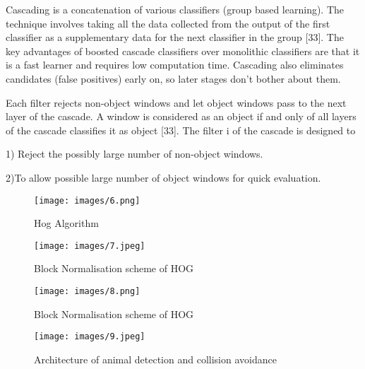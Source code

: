 \documentclass[14pt,a4paper,final]{extreport}
\begin{document}
Cascading is a concatenation of various classifiers (group based learning). The technique involves taking all the data collected from the output of the first classifier as a supplementary data for the next classifier in the group [33]. The key advantages of boosted cascade classifiers over monolithic classifiers are that it is a fast learner and requires low computation time. Cascading also eliminates candidates (false positives) early on, so later stages don’t bother about them.

\item Each filter rejects non-object windows and let object windows pass to the next layer of the cascade. A window is considered as an object if and only of all layers of the cascade classifies it as object [33]. The filter i of the cascade is designed to

\item 1) Reject the possibly large number of non-object windows.

\item 2)To allow possible large number of object windows for quick evaluation.
\newline
\newline

\begin{figure}[h]
	\begin{center}
		\texttt{[image: images/6.png]}
		\vspace{.1 cm}
		\caption[Hog Algorithm]{Hog Algorithm}
	\end{center}
\end{figure}
\begin{figure}[h]
	\begin{center}
		\texttt{[image: images/7.jpeg]}
		\vspace{.1 cm}
		\caption [Block Normalisation scheme of HOG]{Block Normalisation scheme of HOG}
	\end{center}
\end{figure}
\begin{figure}[h]
	\begin{center}
		\texttt{[image: images/8.png]}
		\vspace{.5cm}
		\caption [Block Normalisation scheme of HOG]{Block Normalisation scheme of HOG}
	\end{center}
\end{figure}
\begin{figure}[h]
	\begin{center}
		\texttt{[image: images/9.jpeg]}
		\caption [Architecture of animal detection and collision avoidance]{Architecture of animal detection and collision avoidance}
	\end{center}
\end{figure}
\end{document}
